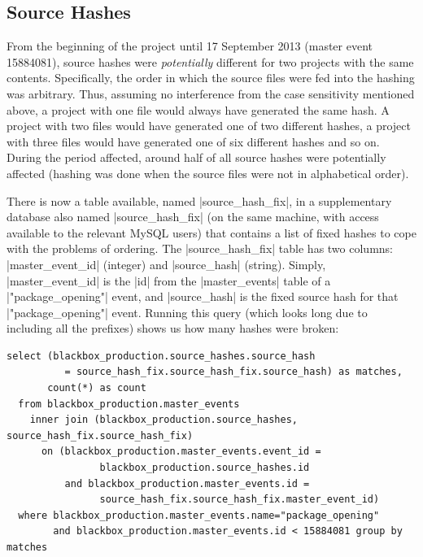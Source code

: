 \documentclass{report}
\begin{document}
\subsection{Source Hashes}

From the beginning of the project until 17 September 2013 (master event 15884081), source hashes were \textit{potentially} different for two projects with the same contents.  Specifically, the order in which the source files were fed into the hashing was arbitrary.  Thus, assuming no interference from the case sensitivity mentioned above, a project with one file would always have generated the same hash.  A project with two files would have generated one of two different hashes, a project with three files would have generated one of six different hashes and so on.  During the period affected, around half of all source hashes were potentially affected (hashing was done when the source files were not in alphabetical order).

There is now a table available, named |source_hash_fix|, in a supplementary database also named |source_hash_fix| (on the same machine, with access available to the relevant MySQL users) that contains a list of fixed hashes to cope with the problems of ordering.  The |source_hash_fix| table has two columns: |master_event_id| (integer) and |source_hash| (string).  Simply, |master_event_id| is the |id| from the |master_events| table of a |"package_opening"| event, and |source_hash| is the fixed source hash for that |"package_opening"| event.  Running this query (which looks long due to including all the prefixes) shows us how many hashes were broken:

\begin{lstlisting}
select (blackbox_production.source_hashes.source_hash
          = source_hash_fix.source_hash_fix.source_hash) as matches,
       count(*) as count
  from blackbox_production.master_events
    inner join (blackbox_production.source_hashes, source_hash_fix.source_hash_fix)
      on (blackbox_production.master_events.event_id =
                blackbox_production.source_hashes.id
          and blackbox_production.master_events.id =
                source_hash_fix.source_hash_fix.master_event_id)
  where blackbox_production.master_events.name="package_opening"
        and blackbox_production.master_events.id < 15884081 group by matches
\end{lstlisting}
\end{document}
